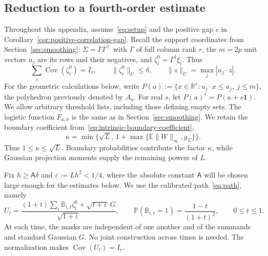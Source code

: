 \documentclass[11pt,letterpaper,twoside,leqno]{article}
\theoremstyle{bookplain}
\theoremstyle{bookremark}
\newcommand{\E}{\mathbb E}
\newcommand{\Pp}{\mathbb P}
\newcommand{\R}{\mathbb R}
\newcommand{\Cov}{\operatorname{Cov}}
\begin{document}
\subsection{Reduction to a fourth-order estimate}\label{hgap:sec:reduction}

Throughout this appendix, assume~\eqref{eq:setup} and the positive gap
$c$ in Corollary~\ref{cor:positive-correlation-gap}. Recall the support
coordinates from Section~\ref{sec:smoothing}: $\Sigma=\Gamma\Gamma^\top$
with $\Gamma$ of full column rank $r$, the $m=2p$ unit vectors $u_j$
are its rows and their negatives, and
$\zeta_i^0=\Gamma^\dagger\xi_i$. Thus
\[
 \sum_i\Cov(\zeta_i^0)=I_r,\qquad
 \|\zeta_i^0\|_U\le\delta,
 \qquad \|z\|_U=\max_j|u_j\cdot z|.
\]
For the geometric calculations below, write
$P(a):=\{x\in\R^r:u_j\cdot x\le a_j,\ j\le m\}$, the polyhedron
previously denoted by $A_a$. For real $s$, let $P(a)^s=P(a+s\mathbf1)$.
We allow arbitrary threshold lists, including those defining empty sets.
The logistic function $F_{a,h}$ is the same as in
Section~\ref{sec:smoothing}. We retain the boundary coefficient
from~\eqref{eq:intrinsic-boundary-coefficient},
\[
 \kappa=\min\{\sqrt L,\,1+\max\{\E\|W\|_\infty,g_\Sigma\}\}.
\]
Thus $1\le\kappa\le\sqrt L$. Boundary probabilities contribute the
factor $\kappa$, while Gaussian projection moments supply the remaining
powers of $L$.

Fix $h\ge\mathsf A\delta$ and $\varepsilon:=Lh^2<1/4$, where the
absolute constant $\mathsf A$ will be chosen large enough for the
estimates below. We use the calibrated path~\eqref{eq:path}, namely
\begin{equation}\label{hgap:eq:path}
 U_t=\frac{(1+t)\sum_i\mathbb B_{i,t}\zeta_i^0
                       +\sqrt{t+\varepsilon}\,G}{\sqrt{1+\varepsilon}},
 \qquad \Pp(\mathbb B_{i,t}=1)=\frac{1-t}{(1+t)^2},
 \qquad 0\le t\le1.
\end{equation}
At each time, the masks are independent of one another and of the
summands and standard Gaussian $G$. No joint construction across times
is needed. The normalization makes $\Cov(U_t)=I_r$.
\end{document}
